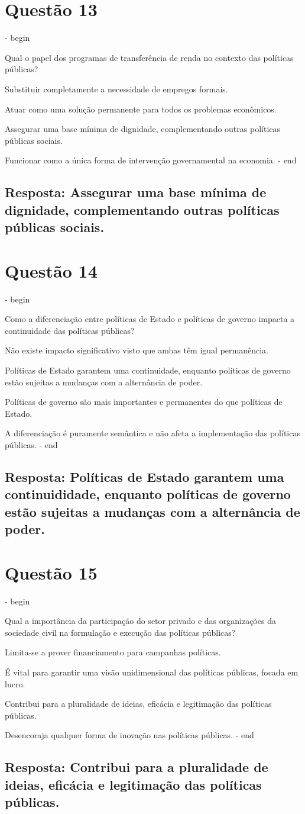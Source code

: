 \documentclass[
   article,       
   12pt,          
   oneside,       
   a4paper,       
   english,       
   brazil,        
   sumario=tradicional
   ]{abntex2}
\begin{document}
\section{Questão 13}
\itemize - begin
\item Qual o papel dos programas de transferência de renda no contexto das políticas públicas?
\item Substituir completamente a necessidade de empregos formais.
\item Atuar como uma solução permanente para todos os problemas econômicos.
\item Assegurar uma base mínima de dignidade, complementando outras políticas públicas sociais.
\item Funcionar como a única forma de intervenção governamental na economia.
\itemize - end
\subsection{Resposta: Assegurar uma base mínima de dignidade, complementando outras políticas públicas sociais.}

\section{Questão 14}
\itemize - begin
\item Como a diferenciação entre políticas de Estado e políticas de governo impacta a continuidade das políticas públicas?
\item Não existe impacto significativo visto que ambas têm igual permanência.
\item Políticas de Estado garantem uma continuidade, enquanto políticas de governo estão sujeitas a mudanças com a alternância de poder.
\item Políticas de governo são mais importantes e permanentes do que políticas de Estado.
\item A diferenciação é puramente semântica e não afeta a implementação das políticas públicas.
\itemize - end
\subsection{Resposta: Políticas de Estado garantem uma continuididade, enquanto políticas de governo estão sujeitas a mudanças com a alternância de poder.}

\section{Questão 15}
\itemize - begin
\item Qual a importância da participação do setor privado e das organizações da sociedade civil na formulação e execução das políticas públicas?
\item Limita-se a prover financiamento para campanhas políticas.
\item É vital para garantir uma visão unidimensional das políticas públicas, focada em lucro.
\item Contribui para a pluralidade de ideias, eficácia e legitimação das políticas públicas.
\item Desencoraja qualquer forma de inovação nas políticas públicas.
\itemize - end
\subsection{Resposta: Contribui para a pluralidade de ideias, eficácia e legitimação das políticas públicas.}
\postextual

\end{document}
